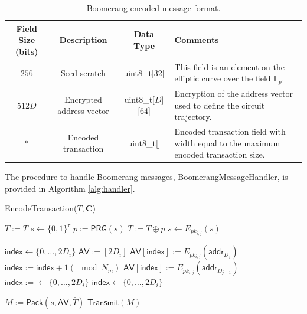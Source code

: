 \begin{table}
\begin{center}
\caption{Boomerang encoded message format.}
\label{tab:msg-header}
    \begin{tabular}{|c|c|c|l|} \hline
    \textbf{Field Size (bits)} & {\bf Description} & {\bf Data Type} & {\bf Comments} \\ \hline
    $256$ & Seed scratch & uint8\_t[32] & This field is an element on the elliptic curve over the field $\mathbb{F}_p$. \\
    $512D$ & Encrypted address vector & uint8\_t[$D$][64] & Encryption of the address vector used to define the circuit trajectory. \\
    $*$ & Encoded transaction & uint8\_t[] & Encoded transaction field with width equal to the maximum encoded transaction size. \\ \hline
    \end{tabular}
\end{center}
\end{table}

The procedure to handle Boomerang messages, {\sf BoomerangMessageHandler}, is provided in Algorithm \ref{alg:handler}. 

\begin{algorithm}[t!]
\caption{{\sf EncodeTransaction}($T, \mathbf{C}$)}
\label{alg:encode}
\begin{algorithmic}[1]

	\State $\bar{T} := T$
	\State $s \gets \{0,1\}^{\tau}$
		\State $p := \mathsf{PRG}(s)$
		\State $\bar{T} := \bar{T} \oplus p$
		\State $s \gets E_{pk_{i,j}}(s)$
	\EndFor

	\State $\mathsf{index} \gets \{0,\dots,2D_i\}$ %
	\State $\mathsf{AV} := [2D_i]$ %
		\State $\mathsf{AV}[\mathsf{index}] := E_{pk_{i,j}}(\mathsf{addr}_{D_j})$
		\State $\mathsf{index} := \mathsf{index} + 1 (\mod N_m)$
		\State $\mathsf{AV}[\mathsf{index}] := E_{pk_{i,j}}(\mathsf{addr}_{D_{j-1}})$
		\State $\mathsf{index} := \gets \{0,\dots,2D_i\}$
			\State $\mathsf{index} \gets \{0,\dots,2D_i\}$
		\EndWhile
	\EndFor

	\State $M := \mathsf{Pack}(s, \mathsf{AV}, \bar{T})$
	\State $\mathsf{Transmit}(M)$
\EndFor

\end{algorithmic}
\end{algorithm}

